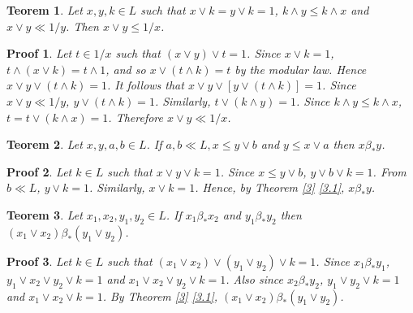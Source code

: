 \documentclass[a4paper,12pt]{article}
\numberwithin{equation}{section}
\theoremstyle{italik}
\newtheorem{teorem}{Teorem}[section]
\newtheorem*{ispat}{Proof}
\begin{document}

\begin{teorem}\label{16}
    Let $ x,y,k \in L $ such that $ x \vee k = y \vee k = 1 $, $ k \wedge y \leq k \wedge x $ and $ x \vee y \ll 1/y $. 
    Then $ x \vee y \leq 1/x $.
\end{teorem}

\begin{ispat}
    Let $ t \in 1/x $ such that $ ( x \vee y ) \vee t = 1 $. Since $ x \vee k = 1 $, $ t \wedge ( x \vee k ) = t \wedge 1 $, 
    and so $ x \vee ( t \wedge k ) = t $ by the modular law. Hence $ x \vee y \vee ( t \wedge k ) = 1 $. 
    It follows that $ x \vee y \vee \left[ y \vee ( t \wedge k ) \right] = 1 $. Since $ x \vee y \ll 1/y $, 
    $ y \vee ( t \wedge k ) = 1 $. Similarly, $ t \vee ( k \wedge y ) = 1 $. 
    Since $ k \wedge y \leq k \wedge x $, $ t = t \vee ( k \wedge x ) = 1 $. Therefore $ x \vee y \ll 1/x $.
\end{ispat}

\begin{teorem}\label{17}
    Let $x,y,a,b \in L $. If $ a,b \ll L, x \leq y \vee b $ and $ y \leq x \vee a $ then $ x \beta_* y $.
\end{teorem}

\begin{ispat}
    Let $ k \in L $ such that $ x \vee y \vee k = 1 $. Since $ x \leq y \vee b $, $ y \vee b \vee k = 1 $. 
    From $ b \ll L $, $ y \vee k = 1 $. Similarly, $ x \vee k = 1 $. 
    Hence, by Theorem \ref{3} \ref{3.1}, $ x \beta_* y $.
\end{ispat}


\begin{teorem}\label{18}
    Let $ x_1,x_2,y_1,y_2 \in L $. If $ x_1 \beta_* x_2 $ and $ y_1 \beta_* y_2 $ then $ ( x_1 \vee x_2 ) \beta_* ( y_1 \vee y_2 ) $.
\end{teorem}

\begin{ispat}
    Let $ k \in L $ such that $ (x_1 \vee x_2 ) \vee (y_1 \vee y_2 ) \vee k = 1 $. Since $ x_1 \beta_* y_1 $, 
    $ y_1 \vee x_2 \vee y_2 \vee k = 1 $ and $ x_1 \vee x_2 \vee y_2 \vee k = 1 $. Also since 
    $ x_2 \beta_* y_2 $, $ y_1 \vee y_2 \vee k = 1 $ and $ x_1 \vee x_2 \vee k = 1 $. 
    By Theorem \ref{3} \ref{3.1}, $ ( x_1 \vee x_2 ) \beta_* ( y_1 \vee y_2 ) $.
\end{ispat}
\end{document}
